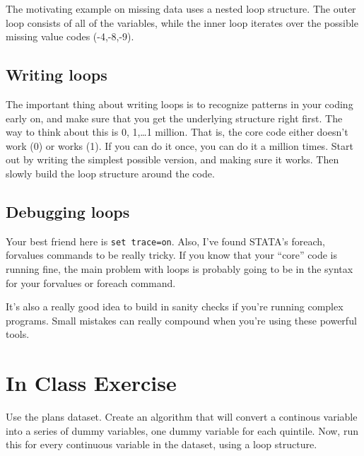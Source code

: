 \documentclass[10pt]{article}
\begin{document}
The motivating example on missing data uses a nested loop
structure. The outer loop consists of all of the variables, while the
inner loop iterates over the possible missing value codes (-4,-8,-9). 

\subsection{Writing loops}

The important thing about writing loops is to recognize patterns in
your coding early on, and make sure that you get the underlying
structure right first. The way to think about this is 0, 1,\ldots  1
million. That is, the core code either doesn't work (0) or works
(1). If you can do it once, you can do it a million times. Start out
by writing the simplest possible version, and making sure it
works. Then slowly build the loop structure around the code. 


\subsection{Debugging loops}

Your best friend here is \texttt{set trace=on}. Also, I've found
STATA's foreach, forvalues commands to be really tricky. If you know
that your ``core'' code is running fine, the main problem with loops
is probably going to be in the syntax for your forvalues or foreach
command. 

It's also a really good idea to build in sanity checks if you're
running complex programs. Small mistakes can really compound when
you're using these powerful tools. 

\section{In Class Exercise}
\label{sec:class-exercise}

Use the plans dataset. Create an algorithm that will convert a continous variable into a
series of dummy variables, one dummy variable for each quintile. Now,
run this for every continuous variable in the dataset, using a loop
structure. 
\end{document}
